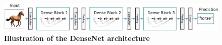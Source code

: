 \begin{figure}[H]
    \centering
    \includegraphics[width=\textwidth]{fig/rel/images/densenet_schema.pdf}
    \caption{\textbf{Illustration of the DenseNet architecture} \autocite{huang2017densely}}
    \label{fig:dense_schema}
\end{figure}